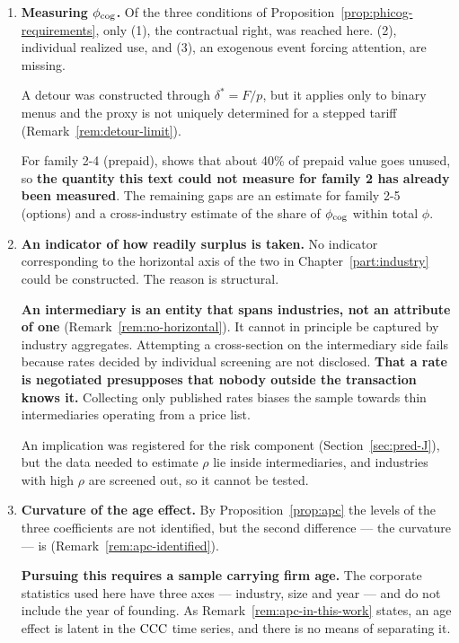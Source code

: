 \begin{enumerate}[label=(\arabic*),start=6]
\item \textbf{Measuring $\phi_{\rm cog}$.}
Of the three conditions of Proposition~\ref{prop:phicog-requirements}, only (1), the
contractual right, was reached here. (2), individual realized use, and (3), an exogenous
event forcing attention, are missing.

A detour was constructed through $\delta^{*}=F/p$, but it applies only to binary menus and
the proxy is not uniquely determined for a stepped tariff (Remark~\ref{rem:detour-limit}).

For family 2-4 (prepaid), \cite{nber2026pnbl} shows that about 40\% of prepaid value goes
unused, so \textbf{the quantity this text could not measure for family 2 has already been
measured}. The remaining gaps are an estimate for family 2-5 (options) and a cross-industry
estimate of the share of $\phi_{\rm cog}$ within total $\phi$.

\item \textbf{An indicator of how readily surplus is taken.}
No indicator corresponding to the horizontal axis of the two in Chapter~\ref{part:industry}
could be constructed. The reason is structural.

\textbf{An intermediary is an entity that spans industries, not an attribute of one}
(Remark~\ref{rem:no-horizontal}). It cannot in principle be captured by industry aggregates.
Attempting a cross-section on the intermediary side fails because rates decided by individual
screening are not disclosed.
\textbf{That a rate is negotiated presupposes that nobody outside the transaction knows it.}
Collecting only published rates biases the sample towards thin intermediaries operating from
a price list.

An implication was registered for the risk component (Section~\ref{sec:pred-J}), but the data
needed to estimate $\rho$ lie inside intermediaries, and industries with high $\rho$ are
screened out, so it cannot be tested.

\item \textbf{Curvature of the age effect.}
By Proposition~\ref{prop:apc} the levels of the three coefficients are not identified, but
the second difference --- the curvature --- is (Remark~\ref{rem:apc-identified}).

\textbf{Pursuing this requires a sample carrying firm age.} The corporate statistics used
here have three axes --- industry, size and year --- and do not include the year of founding.
As Remark~\ref{rem:apc-in-this-work} states, an age effect is latent in the $\mathrm{CCC}$ time
series, and there is no means of separating it.
\end{enumerate}

